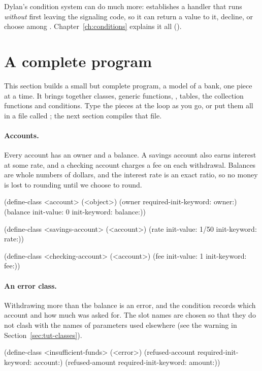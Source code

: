 Dylan's condition system can do much more: 
establishes a handler that runs \emph{without} first leaving the
signaling code, so it can return a value to it, decline, or choose among
. Chapter~\ref{ch:conditions} explains it all
().

\section{A complete program}\label{sec:tut-program}

This section builds a small but complete program, a model of a bank, one
piece at a time. It brings together classes, generic functions,
, tables, the collection functions and conditions. Type
the pieces at the loop as you go, or put them all in a file called
; the next section compiles that file.

\paragraph{Accounts.} Every account has an owner and a balance. A savings
account also earns interest at some rate, and a checking account charges
a fee on each withdrawal. Balances are whole numbers of dollars, and the
interest rate is an exact ratio, so no money is lost to rounding until we
choose to round.

\begin{dylan}
(define-class <account> (<object>)
  (owner   required-init-keyword: owner:)
  (balance init-value: 0 init-keyword: balance:))

(define-class <savings-account> (<account>)
  (rate init-value: 1/50 init-keyword: rate:))

(define-class <checking-account> (<account>)
  (fee init-value: 1 init-keyword: fee:))
\end{dylan}

\paragraph{An error class.} Withdrawing more than the balance is an
error, and the condition records which account and how much was asked
for. The slot names are chosen so that they do not clash with the names of
parameters used elsewhere (see the warning in
Section~\ref{sec:tut-classes}).

\begin{dylan}
(define-class <insufficient-funds> (<error>)
  (refused-account required-init-keyword: account:)
  (refused-amount  required-init-keyword: amount:))
\end{dylan}

